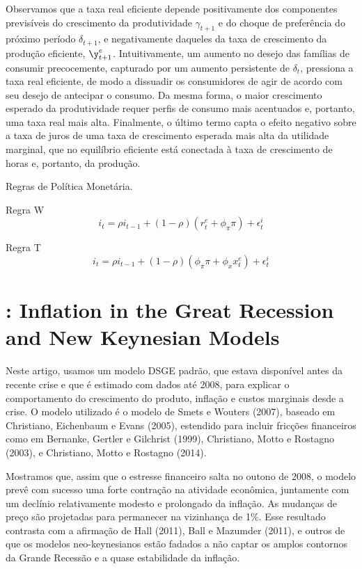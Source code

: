 Observamos que a taxa real eficiente depende positivamente dos componentes previsíveis do crescimento da produtividade $\gamma_{t+1}$ e do choque de preferência do próximo período $\delta_{t+1}$, e negativamente daqueles da taxa de crescimento da produção eficiente, $\y_{t+1}^{e}$. Intuitivamente, um aumento no desejo das famílias de consumir precocemente, capturado por um aumento persistente de $\delta_{t}$, pressiona a taxa real eficiente, de modo a dissuadir os consumidores de agir de acordo com seu desejo de antecipar o consumo. Da mesma forma, o maior crescimento esperado da produtividade requer perfis de consumo mais acentuados e, portanto, uma taxa real mais alta. Finalmente, o último termo capta o efeito negativo sobre a taxa de juros de uma taxa de crescimento esperada mais alta da utilidade marginal, que no equilíbrio eficiente está conectada à taxa de crescimento de horas e, portanto, da produção.

Regras de Política Monetária.

Regra W
\begin{equation}
    i_t = \rho i_{t-1} + (1 - \rho)(r_t^{e} + \phi_{\pi} \pi) + \epsilon_t^{i}
\end{equation}

Regra T
\begin{equation}
    i_t = \rho i_{t-1} + (1 - \rho)(\phi_{\pi} \pi + \phi_x x_t^{e}) + \epsilon_t^{i}
\end{equation}
%
%
\section{\citet{Del-Negro:2015}: Inflation in the Great Recession and New Keynesian Models}

Neste artigo, usamos um modelo DSGE padrão, que estava disponível antes da recente crise e que é estimado com dados até 2008, para explicar o comportamento do crescimento do produto, inflação e custos marginais desde a crise. O modelo utilizado é o modelo de Smets e Wouters (2007), baseado em Christiano, Eichenbaum e Evans (2005), estendido para incluir fricções financeiros como em Bernanke, Gertler e Gilchrist (1999), Christiano, Motto e Rostagno (2003), e Christiano, Motto e Rostagno (2014).

Mostramos que, assim que o estresse financeiro salta no outono de 2008, o modelo prevê com sucesso uma forte contração na atividade econômica, juntamente com um declínio relativamente modesto e prolongado da inflação. As mudanças de preço são projetadas para permanecer na vizinhança de 1$\%$. Esse resultado contrasta com a afirmação de Hall (2011), Ball e Mazumder (2011), e outros de que os modelos neo-keynesianos estão fadados a não captar os amplos contornos da Grande Recessão e a quase estabilidade da inflação.

